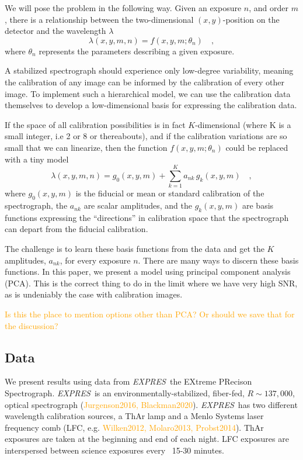 \documentclass[twocolumn]{aastex63}
\newcommand{\lz}[1]{\textcolor{orange}{#1}}
\newcommand{\project}[1]{\textsl{#1}}
\newcommand{\acronym}[1]{{\small{#1}}}
\newcommand{\expres}{\project{\acronym{EXPRES}}}
\begin{document}
We will pose the problem in the following way.  Given an exposure $n$, and order $m$, there is a relationship between
the two-dimensional $(x,y)$-position on the detector and the
wavelength $\lambda$
\begin{equation}
\lambda(x,y,m,n) = f(x,y,m;\theta_{n})
\quad ,
\end{equation}
where $\theta_{n}$ represents the parameters describing a given exposure.

A stabilized spectrograph should experience only low-degree variability, meaning the calibration of any image can be informed by the calibration of every other image.  To implement such a hierarchical model, we can use the calibration data themselves to develop a low-dimensional basis for expressing the calibration data.

If the space of all calibration possibilities is in fact $K$-dimensional (where K is a small integer, i.e 2 or 8 or thereabouts), and if the calibration variations are so small that we can linearize, then the function $f(x,y,m;\theta_{n})$ could be replaced with a tiny model
\begin{equation}
\lambda(x,y,m,n) = g_0(x,y,m) + \sum_{k=1}^K a_{nk}\,g_k(x,y,m)
\quad ,
\end{equation}
where
$g_0(x,y,m)$ is the fiducial or mean or standard calibration of the spectrograph,
the $a_{nk}$ are scalar amplitudes,
and the $g_k(x,y,m)$ are basis functions expressing the ``directions'' in calibration space that the spectrograph can depart from the fiducial calibration.

The challenge is to learn these basis functions from the data and get the $K$ amplitudes, $a_{nk}$, for every exposure $n$.  There are many ways to discern these basis functions.  In this paper, we present a model using principal component analysis (PCA).  This is the correct thing to do in the limit where we have very high SNR, as is undeniably the case with calibration images.

\lz{Is this the place to mention options other than PCA? Or should we save that for the discussion?}

\subsection{Data} \label{sec:data}
We present results using data from \expres\, the EXtreme PRecison Spectrograph.  \expres\ is an environmentally-stabilized, fiber-fed, $R\sim137,000$, optical spectrograph (\lz{Jurgenson2016, Blackman2020}).  \expres\ has two different wavelength calibration sources, a ThAr lamp and a Menlo Systems laser frequency comb (LFC, e.g. \lz{Wilken2012, Molaro2013, Probst2014}).  ThAr exposures are taken at the beginning and end of each night.  LFC exposures are interspersed between science exposures every ~15-30 minutes.
\end{document}
